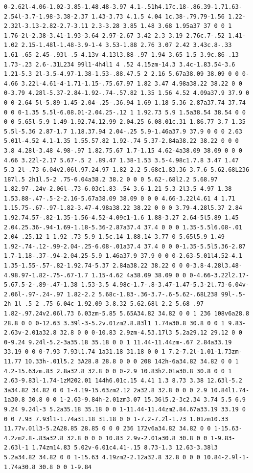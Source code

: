 \documentclass[11pt]{article}
\begin{document}
\begin{enumerate}
\begin{verbatim}
0-2.62l-4.06-1.02-3.85-1.48.48-3.97 4.1-.51h4.17c.18-.86.39-1.71.63-2.54l-3.7-1.98-3.38-2.37 1.43-3.73 4.1.5 4.04 1c.38-.79.79-1.56 1.22-2.32l-3.13-2.82-2.7-3.11 2.3-3.28 3.85 1.48 3.68 1.95a37 37 0 0 1 1.76-2l-2.38-3.41-1.93-3.64 2.97-2.67 3.42 2.3 3.19 2.76c.7-.52 1.41-1.02 2.15-1.48l-1.48-3.9-1-4 3.53-1.88 2.76 3.07 2.42 3.43c.8-.33 1.61-.65 2.45-.93l-.5-4.13v-4.13l3.88-.97 1.94 3.65 1.5 3.9c.86-.13 1.73-.23 2.6-.31L234 99l1-4h4l1 4 .52 4.15zm-14.3 3.4c-1.83.54-3.6 1.21-5.3 2l-3.5-4.97-1.38-1.53-.88.47.5 2 2.16 5.67a38.09 38.09 0 0 0-4.66 3.22l-4.61-4-1.71-1.15-.75.67.97 1.82 3.47 4.98a38.22 38.22 0 0 0-3.79 4.28l-5.37-2.84-1.92-.74-.57.82 1.35 1.56 4.52 4.09a37.9 37.9 0 0 0-2.64 5l-5.89-1.45-2.04-.25-.36.94 1.69 1.18 5.36 2.87a37.74 37.74 0 0 0-1.35 5.5l-6.08.01-2.04.25-.12 1 1.92.73 5.9 1.5a38.54 38.54 0 0 0 0 5.65l-5.9 1.49-1.92.74.12.99 2.04.25 6.08.01c.31 1.86.77 3.7 1.35 5.5l-5.36 2.87-1.7 1.18.37.94 2.04-.25 5.9-1.46a37.9 37.9 0 0 0 2.63 5.01l-4.52 4.1-1.35 1.55.57.82 1.92-.74 5.37-2.84a38.22 38.22 0 0 0 3.8 4.28l-3.48 4.98-.97 1.82.75.67 1.7-1.15 4.62-4a38.09 38.09 0 0 0 4.66 3.22l-2.17 5.67-.5 2 .89.47 1.38-1.53 3.5-4.98c1.7.8 3.47 1.47 5.3 2l-.73 6.04v2.06l.97.24.97-1.82 2.2-5.68c1.83.36 3.7.6 5.62.68L236 187l.5 2h1l.5-2 .75-6.04a38.2 38.2 0 0 0 5.62-.68l2.2 5.68.97 1.82.97-.24v-2.06l-.73-6.03c1.83-.54 3.6-1.21 5.3-2l3.5 4.97 1.38 1.53.88-.47-.5-2-2.16-5.67a38.09 38.09 0 0 0 4.66-3.22l4.61 4 1.71 1.15.75-.67-.97-1.82-3.47-4.98a38.22 38.22 0 0 0 3.79-4.28l5.37 2.84 1.92.74.57-.82-1.35-1.56-4.52-4.09c1-1.6 1.88-3.27 2.64-5l5.89 1.45 2.04.25.36-.94-1.69-1.18-5.36-2.87a37.4 37.4 0 0 0 1.35-5.5l6.08-.01 2.04-.25.12-1-1.92-.73-5.9-1.5c.14-1.88.14-3.77 0-5.65l5.9-1.49 1.92-.74-.12-.99-2.04-.25-6.08-.01a37.4 37.4 0 0 0-1.35-5.5l5.36-2.87 1.7-1.18-.37-.94-2.04.25-5.9 1.46a37.9 37.9 0 0 0-2.63-5.01l4.52-4.1 1.35-1.55-.57-.82-1.92.74-5.37 2.84a38.22 38.22 0 0 0-3.8-4.28l3.48-4.98.97-1.82-.75-.67-1.7 1.15-4.62 4a38.09 38.09 0 0 0-4.66-3.22l2.17-5.67.5-2-.89-.47-1.38 1.53-3.5 4.98c-1.7-.8-3.47-1.47-5.3-2l.73-6.04v-2.06l-.97-.24-.97 1.82-2.2 5.68c-1.83-.36-3.7-.6-5.62-.68L238 99l-.5-2h-1l-.5 2-.75 6.04c-1.92.09-3.8.32-5.62.68l-2.2-5.68-.97-1.82-.97.24v2.06l.73 6.03zm-5.85 5.65A34.82 34.82 0 0 1 236 108v6a28.8 28.8 0 0 0-12.63 3.39l-3-5.2v.01zm2.8.83l1 1.74a30.8 30.8 0 0 1 9.83-2.63v-2.01a32.8 32.8 0 0 0-10.83 2.9zm-4.53.17l3 5.2a29.12 29.12 0 0 0-9.24 9.24l-5.2-3a35.18 35.18 0 0 1 11.44-11.44zm-.67 2.84a33.19 33.19 0 0 0-7.93 7.93l1.74 1a31.18 31.18 0 0 1 7.2-7.2l-1.01-1.73zm-11.77 10.33h-.01l5.2 3A28.8 28.8 0 0 0 208 142h-6a34.82 34.82 0 0 1 4.2-15.63zm.83 2.8a32.8 32.8 0 0 0-2.9 10.83h2.01a30.8 30.8 0 0 1 2.63-9.83l-1.74-1zM202.01 144h6.01c.15 4.41 1.3 8.73 3.38 12.63l-5.2 3a34.82 34.82 0 0 1-4.19-15.63zm2.12 2a32.8 32.8 0 0 0 2.9 10.84l1.74-1a30.8 30.8 0 0 1-2.63-9.84h-2.01zm3.07 15.36l5.2-3c2.34 3.74 5.5 6.9 9.24 9.24l-3 5.2a35.18 35.18 0 0 1-11.44-11.44zm2.84.67a33.19 33.19 0 0 0 7.93 7.93l1-1.74a31.18 31.18 0 0 1-7.2-7.2l-1.73 1.01zm10.33 11.77v.01l3-5.2A28.85 28.85 0 0 0 236 172v6a34.82 34.82 0 0 1-15.63-4.2zm2.8-.83a32.8 32.8 0 0 0 10.83 2.9v-2.01a30.8 30.8 0 0 1-9.83-2.63l-1 1.74zm14.83 5.02v-6.01c4.41-.15 8.73-1.3 12.63-3.38l3 5.2a34.82 34.82 0 0 1-15.63 4.19zm2-2.12a32.8 32.8 0 0 0 10.84-2.9l-1-1.74a30.8 30.8 0 0 1-9.84 
\end{verbatim}
\end{enumerate}
\end{document}
